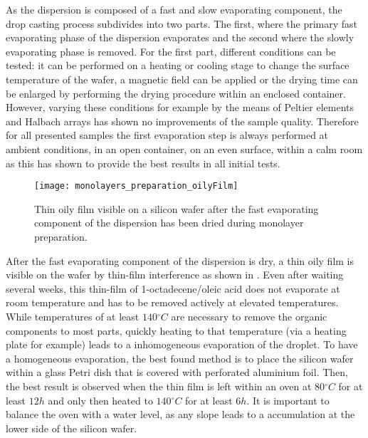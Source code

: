 \documentclass[\main/dresen_thesis.tex]{subfiles}
\begin{document}
  As the dispersion is composed of a fast and slow evaporating component, the drop casting process subdivides into two parts.
  The first, where the primary fast evaporating phase of the dispersion evaporates and the second where the slowly evaporating phase is removed.
  For the first part, different conditions can be tested: it can be performed on a heating or cooling stage to change the surface temperature of the wafer, a magnetic field can be applied or the drying time can be enlarged by performing the drying procedure within an enclosed container.
  However, varying these conditions for example by the means of Peltier elements and Halbach arrays has shown no improvements of the sample quality.
  Therefore for all presented samples the first evaporation step is always performed at ambient conditions, in an open container, on an even surface, within a calm room as this has shown to provide the best results in all initial tests.

  \begin{figure}[tb]
    \centering
    \texttt{[image: monolayers\_preparation\_oilyFilm]}
    \caption{\label{fig:monolayers:preparation:dryingConditions:oilyFilm}Thin oily film visible on a silicon wafer after the fast evaporating component of the dispersion has been dried during monolayer preparation.}
  \end{figure}
  After the fast evaporating component of the dispersion is dry, a thin oily film is visible on the wafer by thin-film interference as shown in .
  Even after waiting several weeks, this thin-film of 1-octadecene/oleic acid does not evaporate at room temperature and has to be removed actively at elevated temperatures.
  While temperatures of at least $140 \unit{^\circ C}$ are necessary to remove the organic components to most parts, quickly heating to that temperature (via a heating plate for example) leads to a inhomogeneous evaporation of the droplet.
  To have a homogeneous evaporation, the best found method is to place the silicon wafer within a glass Petri dish that is covered with perforated aluminium foil.
  Then, the best result is observed when the thin film is left within an oven at $80 \unit{^\circ C}$ for at least $12\unit{h}$ and only then heated to $140 \unit{^\circ C}$ for at least $6\unit{h}$.
  It is important to balance the oven with a water level, as any slope leads to a accumulation at the lower side of the silicon wafer.
\end{document}
